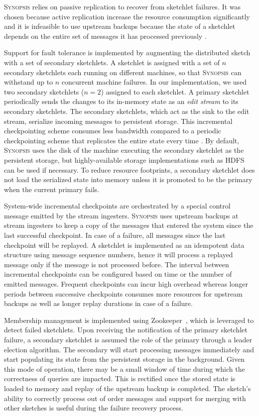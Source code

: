 \textsc{Synopsis} relies on passive replication to recover from sketchlet failures.
It was chosen because active replication increase the resource consumption significantly and it is infeasible to use upstream backups because the state of a sketchlet depends on the entire set of messages it has processed previously \cite{castro2013integrating}.

Support for fault tolerance is implemented by augmenting the distributed sketch with a set of secondary sketchlets.
A sketchlet is assigned with a set of $n$ secondary sketchlets each running on different machines, so that \textsc{Synopsis} can withstand up to $n$ concurrent machine failures.
In our implementation, we used two secondary sketchlets ($n=2$) assigned to each sketchlet.
A primary sketchlet periodically sends the changes to its in-memory state as an \emph{edit stream} to its secondary sketchlets.
The secondary sketchlets, which act as the sink to the edit stream, serialize incoming messages to persistent storage.
This incremental checkpointing scheme consumes less bandwidth compared to a periodic checkpointing scheme that replicates the entire state every time \cite{castro2013integrating}.
By default, \textsc{Synopsis} uses the disk of the machine executing the secondary sketchlet as the persistent storage, but highly-available storage implementations such as HDFS~\cite{borthakur2008hdfs} can be used if necessary.
To reduce resource footprints, a secondary sketchlet does not load the serialized state into memory unless it is promoted to be the primary when the current primary fails.

System-wide incremental checkpoints are orchestrated by a special control message emitted by the stream ingesters.
\textsc{Synopsis} uses upstream backups at stream ingesters to keep a copy of the messages that entered the system since the last successful checkpoint.
In case of a failure, all messages since the last checkpoint will be replayed.
A sketchlet is implemented as an idempotent data structure using message sequence numbers, hence it will process a replayed message only if the message is not processed before.
The interval between incremental checkpoints can be configured based on time or the number of emitted messages.
Frequent checkpoints can incur high overhead whereas longer periods between successive checkpoints consumes more resources for upstream backups as well as longer replay durations in case of a failure.

Membership management is implemented using Zookeeper~\cite{hunt2010zookeeper}, which is leveraged to detect failed sketchlets.
Upon receiving the notification of the primary sketchlet failure, a secondary sketchlet is assumed the role of the primary through a leader election algorithm.
The secondary will start processing messages immediately and start populating its state from the persistent storage in the background.
Given this mode of operation, there may be a small window of time during which the correctness of queries are impacted.
This is rectified once the stored state is loaded to memory and replay of the upstream backup is completed.
The sketch's ability to correctly process out of order messages and support for merging with other sketches is useful during the failure recovery process.


